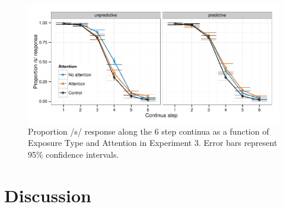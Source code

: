 \begin{figure}[!ht]
\caption{Proportion /s/ response along the 6 step continua as a function of Exposure Type and Attention in Experiment 3.  Error bars represent 95\% confidence intervals.}
\label{fig:exp3categ}
\begin{center}
\includegraphics[width=\textwidth]{graphs/exp3_categresults}
\end{center}
\end{figure}

\section{Discussion}
